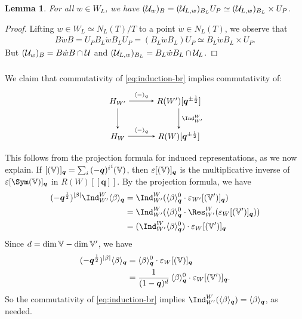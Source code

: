 \documentclass[a4paper,10pt,leqno]{amsart}
\theoremstyle{plain}
\theoremstyle{plain}
\theoremstyle{plain}
\newtheorem{lem}[thm]{Lemma}
\theoremstyle{definition}
\theoremstyle{remark}
\let\Alt\relax
\DeclareMathOperator{\Alt}{\text{$\Lambda$}}
\newcommand{\Q}{\bm{q}}
\newcommand{\Tr}[1]{\langle{#1}\rangle_{\Q}}
\begin{document}
\begin{lem}
For all $w \in W_L$, we have $(\cal{U}_w)_B = (\cal{U}_{L, w})_{B_L} U_P \simeq (\cal{U}_{L, w})_{B_L} \times U_P$.
\end{lem}

\begin{proof}
Lifting $w \in W_L \simeq N_L(T)/T$ to a point $\dot{w} \in N_L(T)$, we observe that
\begin{align}
B\dot{w}B = U_PB_L\dot{w}B_LU_P = (B_L\dot{w}B_L)U_P \simeq B_L\dot{w}B_L \times U_P.
\end{align}
But $(\cal{U}_w)_B = B\dot{w}B \cap \cal{U}$ and $(\cal{U}_{L, w})_{B_L} = B_L\dot{w}B_L \cap \cal{U}_L$.
\end{proof}

\subsubsection{}

We claim that commutativity of \eqref{eq:induction-br} implies commutativity of:
\begin{equation}
\begin{tikzpicture}[baseline=(current bounding box.center), >=stealth]
\matrix(m)[matrix of math nodes, row sep=2.5em, column sep=3em, text height=2ex, text depth=0.5ex]
{	H_{W'}
		&R(W')[\Q^{\pm\frac{1}{2}}]\\
	H_W
		&R(W)[\Q^{\pm\frac{1}{2}}]\\
		};
\path[->,font=\scriptsize, auto]
(m-1-1)		edge node{$\Tr{-}$} (m-1-2)
			edge (m-2-1)
(m-1-2) 	edge node{$\Ind_{W'}^W$} (m-2-2)
(m-2-1) 	edge node{$\Tr{-}$} (m-2-2);
\end{tikzpicture}
\end{equation}
This follows from the projection formula for induced representations, as we now explain.
If $[\Alt(\bb{V})]_{\Q} = \sum_i {(-\Q)^i} \Alt^i(\bb{V})$, then $\varepsilon [\Alt(\bb{V})]_{\Q}$ is the multiplicative inverse of $\varepsilon [\Sym(\bb{V})]_{\Q}$ in $R(W)[\![\Q]\!]$.
By the projection formula, we have
\begin{align}\begin{split}
(-\Q^{\frac{1}{2}})^{|\beta|} 
\Ind_{W'}^W \Tr{\beta} 
&=	
	\Ind_{W'}^W
	{(\Tr{\beta}^0 \cdot \varepsilon_{W'} [\Alt(\bb{V}')]_{\Q})}\\
&=	
	\Ind_{W'}^W
	{(\Tr{\beta}^0 \cdot \Res_{W'}^W(\varepsilon_W [\Alt(\bb{V}')]_{\Q}))}\\
&=	
	(\Ind_{W'}^W \Tr{\beta}^0) \cdot \varepsilon_W [\Alt(\bb{V}')]_{\Q}
\end{split}\end{align}
Since $d = \dim \bb{V} - \dim \bb{V}'$, we have
\begin{align}\begin{split}
(-\Q^{\frac{1}{2}})^{|\beta|} \Tr{\beta}
&=	
	\Tr{\beta}^0 \cdot \varepsilon_W [\Alt(\bb{V})]_{\Q}\\
&=
	\frac{1}{(1 - \Q)^d}\,\Tr{\beta}^0 \cdot \varepsilon_W [\Alt(\bb{V}')]_{\Q}.
\end{split}\end{align}
So the commutativity of \eqref{eq:induction-br} implies $\Ind_{W'}^W(\Tr{\beta}) = \Tr{\beta}$, as needed.
\end{document}
